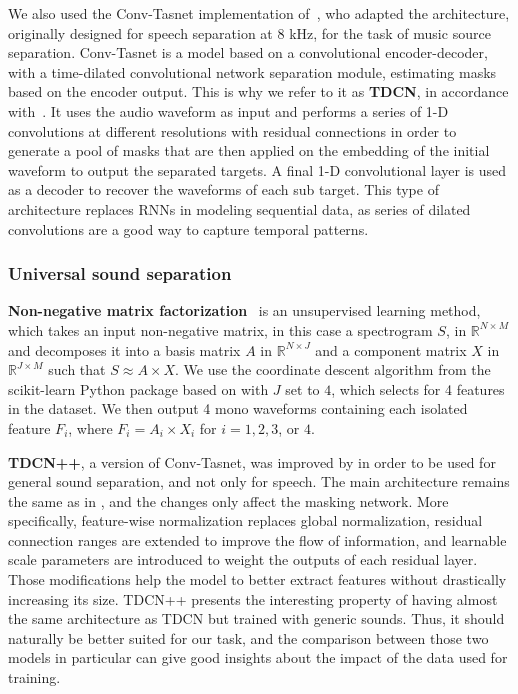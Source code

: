\documentclass{article}
\begin{document}
      We also used the Conv-Tasnet\cite{tdcn} implementation of~\cite{demucs}, who adapted the architecture, originally designed for speech separation at 8 kHz, for the task of music source separation. Conv-Tasnet is a model based on a convolutional encoder-decoder, with a time-dilated convolutional network separation module, estimating masks based on the encoder output. This is why we refer to it as \textbf{TDCN}, in accordance with~\cite{tdcnpp}. It uses the audio waveform as input and performs a series of 1-D convolutions at different resolutions with residual connections in order to generate a pool of masks that are then applied on the embedding of the initial waveform to output the separated targets. A final 1-D convolutional layer is used as a decoder to recover the waveforms of each sub target. This type of architecture replaces RNNs in modeling sequential data, as series of dilated convolutions are a good way to capture temporal patterns.
      
      \subsubsection{Universal sound separation}
      \textbf{Non-negative matrix factorization}~\cite{Cichocki_NMF, Fevotte_NMF} is an unsupervised learning method, which takes an input non-negative matrix, in this case a spectrogram $S$, in $\mathbb{R} ^{N\times M}$ and decomposes it into a basis matrix $A$ in $\mathbb{R}^{N\times J}$ and a component matrix $X$ in $\mathbb{R}^{J\times M}$ such that $S\approx A\times X$. We use the coordinate descent algorithm from the scikit-learn Python package based on \cite{Cichocki_NMF} with $J$ set to $4$, which selects for 4 features in the dataset. We then output 4 mono waveforms containing each isolated feature $F_i$, where $F_i=A_i\times X_i$ for $i = 1, 2, 3$, or $4$.

      \textbf{TDCN++}, a version of Conv-Tasnet, was improved by \cite{tdcnpp} in order to be used for general sound separation, and not only for speech. The main architecture remains the same as in \cite{tdcn}, and the changes only affect the masking network. More specifically, feature-wise normalization replaces global normalization, residual connection ranges are extended to improve the flow of information, and learnable scale parameters are introduced to weight the outputs of each residual layer. Those modifications help the model to better extract features without drastically increasing its size.
      TDCN++ presents the interesting property of having almost the same architecture as TDCN but trained with generic sounds. Thus, it should naturally be better suited for our task, and the comparison between those two models in particular can give good insights about the impact of the data used for training.
  
\end{document}
